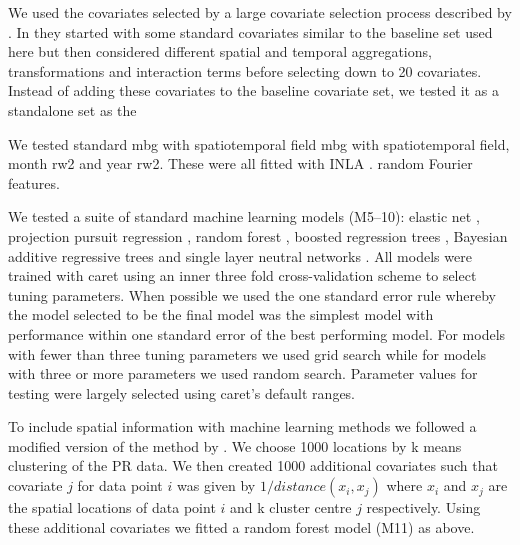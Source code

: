 \documentclass{bmcart}
\begin{document}














We used the covariates selected by a large covariate selection process described by \cite{weiss2015re}.
In \cite{weiss2015re} they started with some standard covariates similar to the baseline set used here but then considered different spatial and temporal aggregations, transformations and interaction terms before selecting down to 20 covariates.
Instead of adding these covariates to the baseline covariate set, we tested it as a standalone set as the




We tested
standard mbg with spatiotemporal field
mbg with spatiotemporal field, month rw2 and year rw2.
These were all fitted with INLA \cite{INLA}.
random Fourier features.


We tested a suite of standard machine learning models (M5--10): elastic net \cite{}, projection pursuit regression \cite{}, random forest \cite{ranger},  boosted regression trees \cite{xgboost}, Bayesian additive regressive trees \cite{} and single layer neutral networks \cite{nnet}.
All models were trained with caret \cite{caret} using an inner three fold cross-validation scheme to select tuning parameters.
When possible we used the one standard error rule \cite{breiman1984classification} whereby the model selected to be the final model was the simplest model with performance within one standard error of the best performing model.
For models with fewer than three tuning parameters we used grid search while for models with three or more parameters we used random search.
Parameter values for testing were largely selected using caret's default ranges.


To include spatial information with machine learning methods we followed a modified version of the method by \cite{}.
We choose 1000 locations by k means clustering of the PR data.
We then created 1000 additional covariates such that covariate $j$ for data point $i$ was given by $1 / distance (x_i, x_j)$ where $x_i$ and $x_j$ are the spatial locations of data point $i$ and k cluster centre $j$ respectively.
Using these additional covariates we fitted a random forest model (M11) as above.
\end{document}
